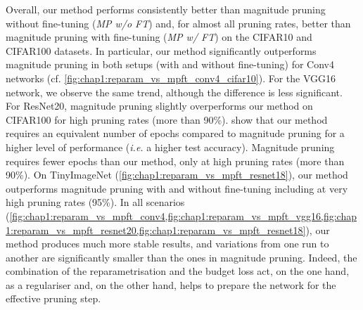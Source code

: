 Overall, our method performs consistently better than magnitude pruning without
fine-tuning (\emph{MP w/o FT}) and, for almost all pruning rates, better than
magnitude pruning with fine-tuning (\emph{MP w/ FT}) on the CIFAR10 and CIFAR100
datasets. In particular, our method significantly outperforms magnitude pruning
in both setups (with and without fine-tuning) for Conv4 networks (cf.
\cref{fig:chap1:reparam_vs_mpft_conv4_cifar10}). For the VGG16 network, we
observe the same trend, although the difference is less significant. For
ResNet20, magnitude pruning slightly overperforms our method on CIFAR100 for
high pruning rates (more than 90\%).
show that our method requires an equivalent number of epochs compared to
magnitude pruning for a higher level of performance (\textit{i.e.} a higher test
accuracy). Magnitude pruning requires fewer epochs than our method, only at high
pruning rates (more than 90\%). On TinyImageNet
(\cref{fig:chap1:reparam_vs_mpft_resnet18}), our method outperforms magnitude
pruning with and without fine-tuning including at very high pruning rates
(95\%). In all scenarios
(\cref{fig:chap1:reparam_vs_mpft_conv4,fig:chap1:reparam_vs_mpft_vgg16,fig:chap1:reparam_vs_mpft_resnet20,fig:chap1:reparam_vs_mpft_resnet18}),
our method produces much more stable results, and variations from one run to
another are significantly smaller than the ones in magnitude pruning. Indeed,
the combination of the reparametrisation and the budget loss act, on the one
hand, as a regulariser and, on the other hand, helps to prepare the network for
the effective pruning step.\\

